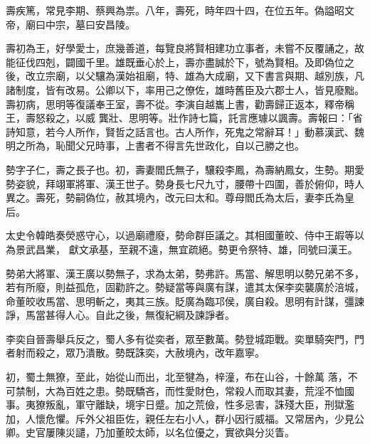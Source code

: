 \begin{pinyinscope}
 壽疾篤，常見李期、蔡興為祟。八年，壽死，時年四十四，在位五年。偽謚昭文帝，廟曰中宗，墓曰安昌陵。



 壽初為王，好學愛士，庶幾善道，每覽良將賢相建功立事者，未嘗不反覆誦之，故能征伐四剋，闢國千里。雄既垂心於上，壽亦盡誠於下，號為賢相。及即偽位之後，改立宗廟，以父驤為漢始祖廟，特、雄為大成廟，又下書言與期、越別族，凡諸制度，皆有改易。公卿以下，率用己之僚佐，雄時舊臣及六郡士人，皆見廢黜。壽初病，思明等復議奉王室，壽不從。李演自越巂上書，勸壽歸正返本，釋帝稱王，壽怒殺之，以威
 龔壯、思明等。壯作詩七篇，託言應璩以諷壽。壽報曰：「省詩知意，若今人所作，賢哲之話言也。古人所作，死鬼之常辭耳！」動慕漢武、魏明之所為，恥聞父兄時事，上書者不得言先世政化，自以己勝之也。



 勢字子仁，壽之長子也。初，壽妻閻氏無子，驤殺李鳳，為壽納鳳女，生勢。期愛勢姿貌，拜翊軍將軍、漢王世子。勢身長七尺九寸，腰帶十四圍，善於俯仰，時人異之。壽死，勢嗣偽位，赦其境內，改元曰太和。尊母閻氏為太后，妻李氏為皇后。



 太史令韓皓奏熒惑守心，以過廟禮廢，勢命群臣議之。其相國董皎、侍中王嘏等以為景武昌業，
 獻文承基，至親不遠，無宜疏絕。勢更令祭特、雄，同號曰漢王。



 勢弟大將軍、漢王廣以勢無子，求為太弟，勢弗許。馬當、解思明以勢兄弟不多，若有所廢，則益孤危，固勸許之。勢疑當等與廣有謀，遣其太保李奕襲廣於涪城，命董皎收馬當、思明斬之，夷其三族。貶廣為臨邛侯，廣自殺。思明有計謀，彊諫諍，馬當甚得人心。自此之後，無復紀綱及諫諍者。



 李奕自晉壽舉兵反之，蜀人多有從奕者，眾至數萬。勢登城距戰。奕單騎突門，門者射而殺之，眾乃潰散。勢既誅奕，大赦境內，改年嘉寧。



 初，蜀土無獠，至此，始從山而出，北至犍為，梓潼，布在山谷，十餘萬
 落，不可禁制，大為百姓之患。勢既驕吝，而性愛財色，常殺人而取其妻，荒淫不恤國事。夷獠叛亂，軍守離缺，境宇日蹙。加之荒儉，性多忌害，誅殘大臣，刑獄濫加，人懷危懼。斥外父祖臣佐，親任左右小人，群小因行威福。又常居內，少見公卿。史官屢陳災譴，乃加董皎太師，以名位優之，實欲與分災眚。




\end{pinyinscope}
